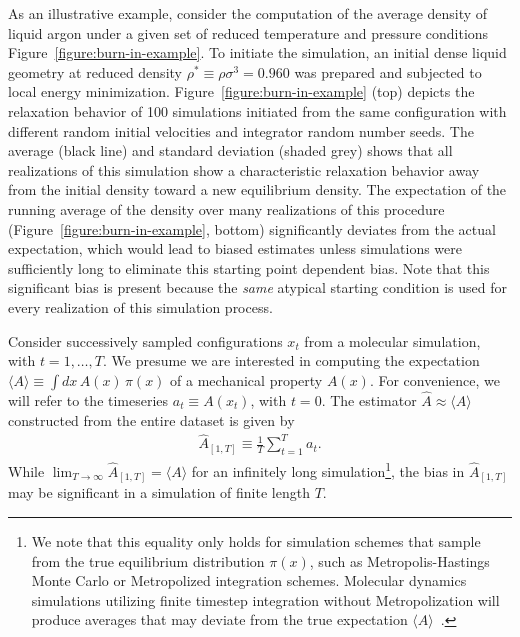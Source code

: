 \documentclass[aps,pre,twocolumn,nofootinbib,superscriptaddress,linenumbers,11point]{revtex4-1}
\newcommand{\expect}[1]{\langle #1 \rangle}                %
\begin{document}
As an illustrative example, consider the computation of the average density of liquid argon under a given set of reduced temperature and pressure conditions Figure~\ref{figure:burn-in-example}.
To initiate the simulation, an initial dense liquid geometry at reduced density $\rho^* \equiv \rho \sigma^3 = 0.960$ was prepared and subjected to local energy minimization.
Figure~\ref{figure:burn-in-example} (top) depicts the relaxation behavior of 100 simulations initiated from the same configuration with different random initial velocities and integrator random number seeds.
The average (black line) and standard deviation (shaded grey) shows that all realizations of this simulation show a characteristic relaxation behavior away from the initial density toward a new equilibrium density.
The expectation of the running average of the density over many realizations of this procedure ({Figure~\ref{figure:burn-in-example}, bottom}) significantly deviates from the actual expectation, which would lead to biased estimates unless simulations were sufficiently long to eliminate this starting point dependent bias.
Note that this significant bias is present because the \emph{same} atypical starting condition is used for every realization of this simulation process.

Consider successively sampled configurations $x_t$ from a molecular simulation, with $t = 1, \ldots, T$.
We presume we are interested in computing the expectation $\expect{A} \equiv \int dx \, A(x) \, \pi(x)$ of a mechanical property $A(x)$.
For convenience, we will refer to the timeseries $a_t \equiv A(x_t)$, with $t = 0$.
The estimator $\hat{A} \approx \expect{A}$ constructed from the entire dataset is given by
\begin{eqnarray}
\hat{A}_{[1,T]} \equiv \frac{1}{T} \sum_{t=1}^T a_t . \label{equation:time-average}
\end{eqnarray}
While $\lim_{T \rightarrow \infty} \hat{A}_{[1,T]} = \expect{A}$ for an infinitely long simulation\footnote{We note that this equality only holds for simulation schemes that sample from the true equilibrium distribution $\pi(x)$, such as Metropolis-Hastings Monte Carlo or Metropolized integration schemes. Molecular dynamics simulations utilizing finite timestep integration without Metropolization will produce averages that may deviate from the true expectation $\expect{A}$~\cite{deviation}.}, the bias in $\hat{A}_{[1,T]}$ may be significant in a simulation of finite length $T$.
\end{document}
